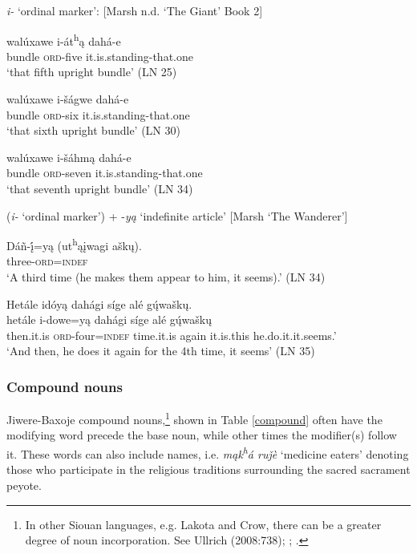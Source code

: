 \documentclass[output=paper]{LSP/langsci}
\begin{document}
\begin{exe}
\ex  \textit{i-} `ordinal marker':    [Marsh n.d. `The Giant' Book 2]
\begin{xlist}	
\ex 
\gll  wal\'uxawe i-\'at\textsuperscript{h}\k{a}  dah\'a-e   \\
bundle      \textsc{ord}-five     it.is.standing-that.one \\
\trans `that fifth upright bundle' (LN 25) 
			
\ex 
\gll  wal\'uxawe i-\v{s}\'agwe dah\'a-e  \\
bundle      \textsc{ord}-six     it.is.standing-that.one \\
\trans `that sixth upright bundle' (LN 30)

\ex 
\gll wal\'uxawe  i-\v{s}\'ahm\k{a}  dah\'a-e \\  
bundle     \textsc{ord}-seven    it.is.standing-that.one \\
\trans {}`that seventh upright bundle' (LN 34)
\end{xlist}
\ex (\textit{i-} `ordinal marker') + -\textit{y\k{a}} `indefinite article' [Marsh `The Wanderer']
\begin{xlist}
\ex \gll D\'a\~n-\k{\'i}=y\k{a}     (ut\textsuperscript{h}\k{a}\k{i}wagi  a\v{s}k\k{u}).   \\
	three-\textsc{ord}=\textsc{indef} {} {} \\
\trans `A third time (he makes them appear to him, it seems).'	 (LN 34)  
		 
\ex 
\glll Het\'ale    id\'oy\k{a} dah\'agi   s\'ige   al\'e   g\k{\'u}wa\v{s}k\k{u}. \\
het\'ale i-dowe=y\k{a}  dah\'agi s\'ige   al\'e   g\k{\'u}wa\v{s}k\k{u} \\		   
then.it.is \textsc{ord}-four=\textsc{indef} time.it.is  again it.is.this he.do.it.it.seems.' \\ 
\trans `And then, he does it again for the 4th time, it seems' (LN 35)
\end{xlist}
\end{exe}
\subsubsection{Compound nouns} 
Jiwere-Baxoje compound nouns,\footnote{In other Siouan languages, e.g. Lakota and Crow, there can be a greater degree of noun incorporation. See Ullrich (2008:738); \citet{DeReuse1994}; \citet{Gracyzk1991}.} shown in Table \ref{compound} often have the modifying word precede the base noun, while other times the modifier(s) follow it. These words can also include names, i.e. \textit{m\k{a}k\textsuperscript{h}\'a  ru\v{j}\`e} `medicine eaters' denoting those who participate in the religious traditions surrounding the sacred sacrament peyote.  
\end{document}
